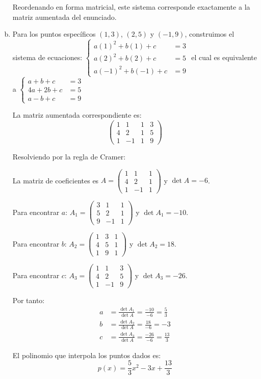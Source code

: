\begin{prob}
\begin{myproof}
\begin{enumerate}[a)]
Reordenando en forma matricial, este sistema corresponde exactamente a la matriz aumentada del enunciado.

\item Para los puntos específicos $(1,3)$, $(2,5)$ y $(-1,9)$, construimos el sistema de ecuaciones: $\begin{cases}
a(1)^2 + b(1) + c &= 3\\
a(2)^2 + b(2) + c &= 5\\
a(-1)^2 + b(-1) + c &= 9
\end{cases}$ 
el cual es equivalente a $\begin{cases}
a + b + c &= 3\\
4a + 2b + c &= 5\\
a - b + c &= 9
\end{cases}$

La matriz aumentada correspondiente es:
\[ \left( \begin{array}{ccc|c} 
1 & 1 & 1 & 3\\
4 & 2 & 1 & 5\\
1 & -1 & 1 & 9
\end{array} \right) \]

Resolviendo por la regla de Cramer:

La matriz de coeficientes es $A=\begin{pmatrix}
1 & 1 & 1 \\
4 & 2 & 1 \\
1 & -1 & 1
\end{pmatrix}$ y $\det A = -6$.

Para encontrar $a$: $A_1=\begin{pmatrix}
3 & 1 & 1 \\
5 & 2 & 1 \\
9 & -1 & 1
\end{pmatrix}$ y $\det A_1 = -10$.

Para encontrar $b$: $A_2=\begin{pmatrix}
1 & 3 & 1 \\
4 & 5 & 1 \\
1 & 9 & 1
\end{pmatrix}$ y $\det A_2 = 18$.

Para encontrar $c$: $A_3=\begin{pmatrix}
1 & 1 & 3 \\
4 & 2 & 5 \\
1 & -1 & 9
\end{pmatrix}$ y $\det A_3 = -26$.

Por tanto:
\begin{align*}
a &= \frac{\det A_1}{\det A} = \frac{-10}{-6} = \frac{5}{3}\\
b &= \frac{\det A_2}{\det A} = \frac{18}{-6} = -3\\
c &= \frac{\det A_3}{\det A} = \frac{-26}{-6} = \frac{13}{3}
\end{align*}

El polinomio que interpola los puntos dados es:
\[ p(x) = \frac{5}{3}x^2 - 3x + \frac{13}{3} \]
\end{enumerate}
\end{myproof}

\end{prob}


